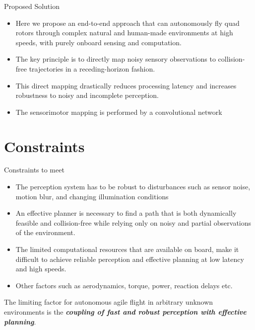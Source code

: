 \documentclass{beamer}
\begin{document}
\begin{frame}{Proposed Solution}
	\begin{itemize}
		\item Here we propose an end-to-end approach that can autonomously fly quad rotors through complex natural and human-made environments at high speeds, with purely onboard sensing and computation.
		
		\item The key principle is to directly map noisy sensory observations to collision-free trajectories in a receding-horizon \autocite{receding_horizon} fashion. 
		
		\item This direct mapping drastically reduces processing latency and increases robustness to noisy and incomplete perception. 
		
		\item The sensorimotor mapping is performed by a convolutional network
	\end{itemize}
\end{frame}

\section{Constraints}
\begin{frame}{Constraints to meet}
	\begin{itemize}
		\item The perception system has to be robust to disturbances such as sensor noise, motion blur, and changing illumination conditions
		\item An effective planner is necessary to find a path that is both dynamically feasible and collision-free while relying only on noisy and partial observations of the environment.
		\item The limited computational resources that are available on board, make it difficult to achieve reliable perception and effective planning at low latency and high speeds.
		\item Other factors such as aerodynamics, torque, power, reaction delays etc.
	\end{itemize}
	The limiting factor for autonomous agile flight in arbitrary unknown environments is the \textbf{\textit{coupling of fast and robust perception with effective planning}}.
\end{frame}
\end{document}
